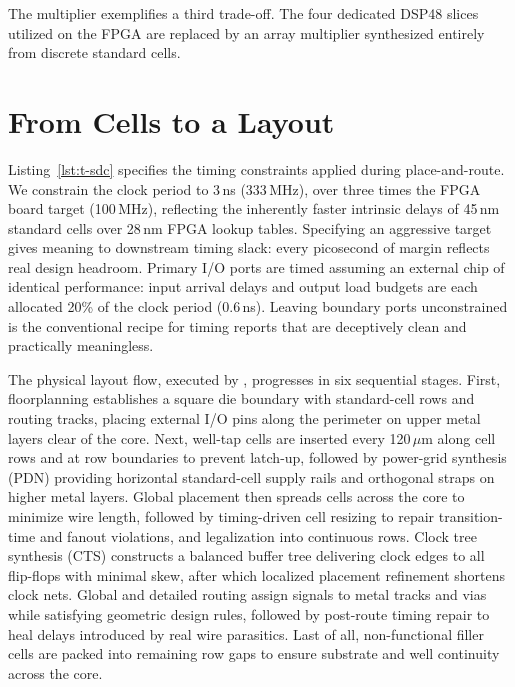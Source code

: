 \documentclass[journal,9pt]{IEEEtran}
\begin{document}
The multiplier exemplifies a third trade-off. The four dedicated DSP48
slices utilized on the FPGA are replaced by an array multiplier
synthesized entirely from discrete standard cells.

\section{From Cells to a Layout}
\label{sec:t-pnr}

Listing~\ref{lst:t-sdc} specifies the timing constraints applied during
place-and-route. We constrain the clock period to 3\,ns (333\,MHz), over
three times the FPGA board target (100\,MHz), reflecting the inherently
faster intrinsic delays of 45\,nm standard cells over 28\,nm FPGA lookup
tables. Specifying an aggressive target gives meaning to downstream
timing slack: every picosecond of margin reflects real design
headroom. Primary I/O ports are timed assuming an external chip of
identical performance: input arrival delays and output load budgets are
each allocated 20\% of the clock period ($0.6$\,ns). Leaving boundary
ports unconstrained is the conventional recipe for timing reports that
are deceptively clean and practically meaningless.



The physical layout flow, executed by ,
progresses in six sequential stages. First, floorplanning establishes a
square die boundary with standard-cell rows and routing tracks, placing
external I/O pins along the perimeter on upper metal layers clear of the
core. Next, well-tap cells are inserted every 120\,$\mu$m along cell rows
and at row boundaries to prevent latch-up, followed by power-grid
synthesis (PDN) providing horizontal standard-cell supply rails and
orthogonal straps on higher metal layers. Global placement then spreads
cells across the core to minimize wire length, followed by timing-driven
cell resizing to repair transition-time and fanout violations, and
legalization into continuous rows. Clock tree synthesis (CTS) constructs
a balanced buffer tree delivering clock edges to all \asicflops{}
flip-flops with minimal skew, after which localized placement refinement
shortens clock nets. Global and detailed routing assign signals to
metal tracks and vias while satisfying geometric design rules, followed
by post-route timing repair to heal delays introduced by real wire
parasitics. Last of all, non-functional filler cells are packed into
remaining row gaps to ensure substrate and well continuity across the
core.
\end{document}
